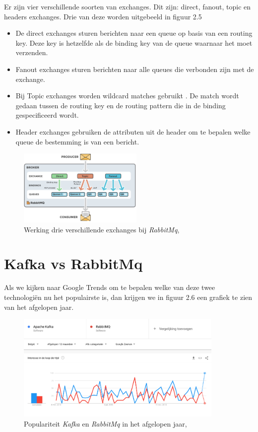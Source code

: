 Er zijn vier verschillende soorten van exchanges. Dit zijn: direct, fanout, topic en headers exchanges. Drie van deze worden uitgebeeld in figuur 2.5 \begin{itemize}
    \item De direct exchanges sturen berichten naar een queue op basis van een routing key. Deze key is hetzelfde als de binding key van de queue waarnaar het moet verzenden. 
    \item Fanout exchanges sturen berichten naar alle queues die verbonden zijn met de exchange.
    \item Bij Topic exchanges worden wildcard matches gebruikt . De match wordt gedaan tussen de routing key en de routing pattern die in de binding gespecificeerd wordt.
    \item Header exchanges gebruiken de attributen uit de header om te bepalen welke queue de bestemming is van een bericht.
\end{itemize}
 \begin{figure}[h!]
    \centering
    \includegraphics[width=60mm]{../rabbitmqExchanges.png}
    \caption{Werking drie verschillende exchanges bij \emph{RabbitMq}, \autocite{Johansson2015}}
    
\end{figure}
\autocite{Johansson2015}
\section{Kafka vs RabbitMq}
Als we kijken naar Google Trends om te bepalen welke van deze twee technologiën nu het populairste is, dan krijgen we in figuur 2.6 een grafiek te zien van het afgelopen jaar.
 \begin{figure}[h!]
    \centering
    \includegraphics[width=100mm]{../KvsRMQ1.png}
    \caption{Populariteit \emph{Kafka} en \emph{RabbitMq} in het afgelopen jaar, \autocite{Trends2019}}
    
\end{figure}


